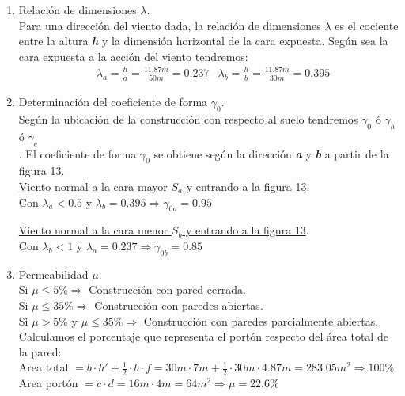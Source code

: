 \begin{enumerate}
\begin{itemize}
\end{itemize}

\item Relación de dimensiones $\lambda$.\\
Para una dirección del viento dada, la relación de dimensiones $\lambda$ es el cociente entre la altura \emph{\textbf{h}} y la dimensión horizontal de la cara expuesta. Según sea la cara expuesta a la acción del viento tendremos:\\

\begin{align*}
& \lambda_a = \frac{h}{a} = \frac{11.87m}{50m} = 0.237
& \lambda_b = \frac{h}{b} = \frac{11.87m}{30m} = 0.395
\end{align*}

\item Determinación del coeficiente de forma $\gamma_0$.\\
Según la ubicación de la construcción con respecto al suelo tendremos $\gamma_0$ ó $\gamma_h$ ó $\gamma_e$\\.
El coeficiente de forma $\gamma_0$ se obtiene según la dirección \emph{\textbf{a}} y \emph{\textbf{b}} a partir de la figura 13.\\

\underline{Viento normal a la cara mayor $S_a$ y entrando a la figura 13}.\\

Con $ \lambda_a < 0.5 $ y $ \lambda_b = 0.395 \Rightarrow \gamma_{0a} = 0.95$

\underline{Viento normal a la cara menor $S_b$ y entrando a la figura 13}.\\

Con $ \lambda_b < 1 $ y $ \lambda_a = 0.237 \Rightarrow \gamma_{0b} = 0.85$

\newpage
\item Permeabilidad $\mu$. \\
Si $\mu \leq 5\% \Rightarrow $ Construcción con pared cerrada.\\
Si $\mu \leq 35\% \Rightarrow $ Construcción con paredes abiertas.\\
Si $\mu > 5\%$ y $\mu \leq 35\% \Rightarrow $ Construcción con paredes parcialmente abiertas.\\
Calculamos el porcentaje que representa el portón respecto del área total de la pared:\\
Area total $= b \cdot h'+ \frac{1}{2} \cdot b \cdot f = 30m \cdot 7m+ \frac{1}{2} \cdot 30m \cdot 4.87m = 283.05 m^2 \Rightarrow 100\% $\\
Area portón $= c \cdot d = 16m \cdot 4m = 64 m^2 \Rightarrow \mu = 22.6 \%$ \\



\end{enumerate}
